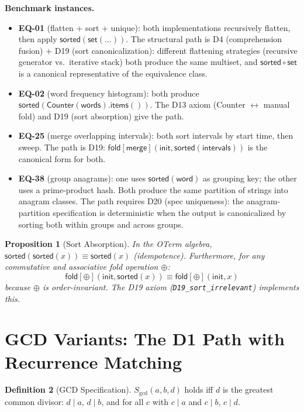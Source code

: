 \documentclass[11pt,a4paper]{report}
\theoremstyle{definition}
\newtheorem{definition}{Definition}[chapter]
\theoremstyle{plain}
\newtheorem{proposition}[definition]{Proposition}
\newcommand{\fold}{\mathsf{fold}}
\begin{document}
\noindent\textbf{Benchmark instances.}
\begin{itemize}
  \item \textbf{EQ-01} (flatten + sort + unique): both
    implementations recursively flatten, then apply
    $\mathsf{sorted}(\mathsf{set}(\ldots))$.  The structural
    path is D4 (comprehension fusion) $+$ D19 (sort canonicalization):
    different flattening strategies (recursive generator vs.\
    iterative stack) both produce the same multiset, and
    $\mathsf{sorted} \circ \mathsf{set}$ is a canonical
    representative of the equivalence class.
  \item \textbf{EQ-02} (word frequency histogram): both produce
    $\mathsf{sorted}(\mathsf{Counter}(\mathsf{words}).
    \mathsf{items}())$.  The D13 axiom (Counter $\leftrightarrow$
    manual fold) and D19 (sort absorption) give the path.
  \item \textbf{EQ-25} (merge overlapping intervals): both sort
    intervals by start time, then sweep.  The path is D19:
    $\fold[\mathsf{merge}](\mathsf{init},
    \mathsf{sorted}(\mathsf{intervals}))$
    is the canonical form for both.
  \item \textbf{EQ-38} (group anagrams): one uses
    $\mathsf{sorted}(\mathsf{word})$ as grouping key; the other
    uses a prime-product hash.  Both produce the same partition
    of strings into anagram classes.  The path requires D20
    (spec uniqueness): the anagram-partition specification is
    deterministic when the output is canonicalized by sorting
    both within groups and across groups.
\end{itemize}

\begin{proposition}[Sort Absorption]
\label{prop:sort-absorb}
In the OTerm algebra, $\mathsf{sorted}(\mathsf{sorted}(x)) \equiv
\mathsf{sorted}(x)$ (idempotence).  Furthermore, for any
commutative and associative fold operation $\oplus$:
\[
  \fold[\oplus](\mathsf{init}, \mathsf{sorted}(x)) \equiv
  \fold[\oplus](\mathsf{init}, x)
\]
because $\oplus$ is order-invariant.  The D19 axiom
(\texttt{D19\_sort\_irrelevant}) implements this.
\end{proposition}

\section{GCD Variants: The D1 Path with Recurrence Matching}
\label{sec:gcd-variants}

\begin{definition}[GCD Specification]
$S_{\gcd}(a, b, d)$ holds iff $d$ is the greatest common divisor:
$d \mid a$, $d \mid b$, and for all $c$ with $c \mid a$ and
$c \mid b$, $c \mid d$.
\end{definition}
\end{document}
